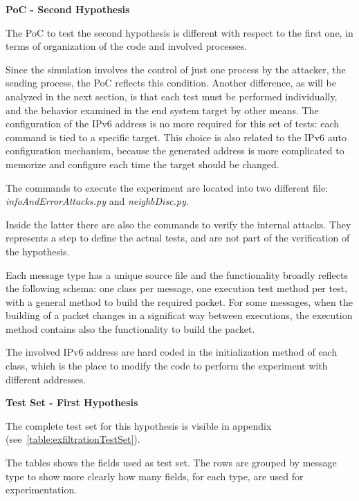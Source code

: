 \documentclass[12pt]{article}
\begin{document}
\textbf{PoC - Second Hypothesis}

The PoC to test the second hypothesis is different with respect to the first one, in terms of organization of the code and involved processes. 

Since the simulation involves the control of just one process by the attacker, the sending process, the PoC reflects this condition. Another difference, as will be analyzed in the next section, is that each test must be performed individually, and the behavior examined in the end system target by other means. The configuration of the IPv6 address is no more required for this set of tests: each command is tied to a specific target. This choice is also related to the IPv6 auto configuration mechanism, because the generated address is more complicated to memorize and configure each time the target should be changed.

The commands to execute the experiment are located into two different file: \textit{infoAndErrorAttacks.py} and \textit{neighbDisc.py}. 

Inside the latter there are also the commands to verify the internal attacks. They represents a step to define the actual tests, and are not part of the verification of the hypothesis.

Each message type has a unique source file and the functionality broadly reflects the following schema: one class per message, one execution test method per test, with a general method to build the required packet. For some messages, when the building of a packet changes in a significat way between executions, the execution method contains also the functionality to build the packet.

The involved IPv6 address are hard coded in the initialization method of each class, which is the place to modify the code to perform the experiment with different addresses.

\textbf{Test Set - First Hypothesis}

The complete test set for this hypothesis is visible in appendix (see~\ref{table:exfiltrationTestSet}).

The tables shows the fields used as test set. The rows are grouped by message type to show more clearly how many fields, for each type, are used for experimentation.
\end{document}
